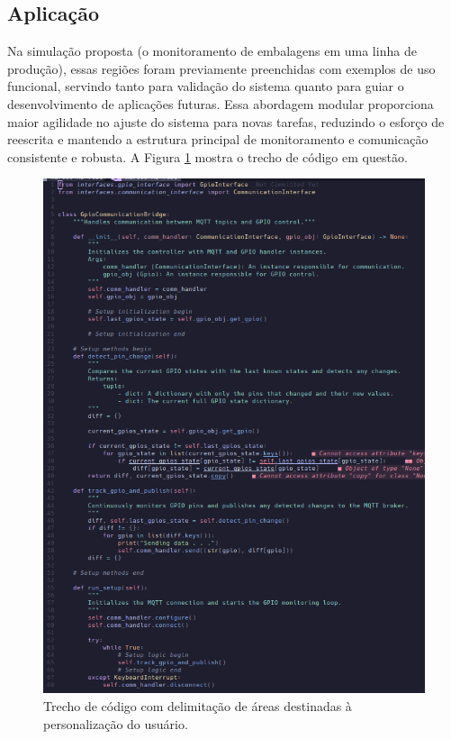 \documentclass{ecatfg}
\begin{document}
\subsection{Aplicação}
 Na simulação proposta (o monitoramento de embalagens em uma linha de produção), essas regiões foram previamente preenchidas com exemplos de uso funcional, servindo tanto para validação do sistema quanto para guiar o desenvolvimento de aplicações futuras. Essa abordagem modular proporciona maior agilidade no ajuste do sistema para novas tarefas, reduzindo o esforço de reescrita e mantendo a estrutura principal de monitoramento e comunicação consistente e robusta. A Figura \ref{fig:14} mostra o trecho de código em questão. \par

\begin{figure}[!htb]
    \centering
    \includegraphics[scale=0.273]{Figuras/communication_gpio_controller_preenchido.png}
    \caption{Trecho de código com delimitação de áreas destinadas à personalização do usuário.}
    \label{fig:14}
\end{figure}
\end{document}
